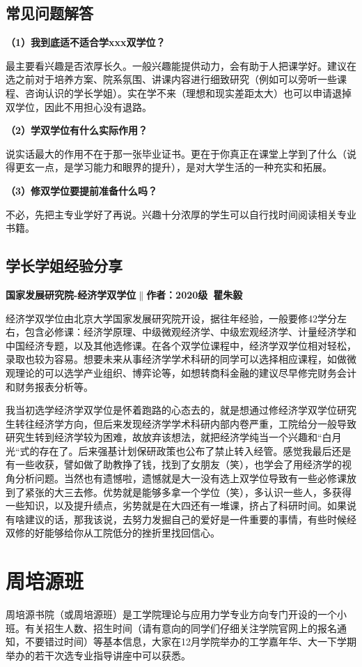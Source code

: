 \documentclass[11pt,oneside]{book}
\begin{document}
\subsection{常见问题解答}
\textbf{（1）我到底适不适合学xxx双学位？}

最主要看兴趣是否浓厚长久。一般兴趣能提供动力，会有助于人把课学好。建议在选之前对于培养方案、院系氛围、讲课内容进行细致研究（例如可以旁听一些课程、咨询认识的学长学姐）。实在学不来（理想和现实差距太大）也可以申请退掉双学位，因此不用担心没有退路。

\textbf{（2）学双学位有什么实际作用？}

说实话最大的作用不在于那一张毕业证书。更在于你真正在课堂上学到了什么（说得更玄一点，是学习能力和眼界的提升），是对大学生活的一种充实和拓展。

\textbf{（3）修双学位要提前准备什么吗？}

不必，先把主专业学好了再说。兴趣十分浓厚的学生可以自行找时间阅读相关专业书籍。

 
\subsection{学长学姐经验分享}
\textbf{国家发展研究院-经济学双学位$\parallel$作者：2020级\ 瞿朱毅}

经济学双学位由北京大学国家发展研究院开设，据往年经验，一般要修42学分左右，包含必修课：经济学原理、中级微观经济学、中级宏观经济学、计量经济学和中国经济专题，以及其他选修课。在各个双学位课程中，经济学双学位相对轻松，录取也较为容易。想要未来从事经济学学术科研的同学可以选择相应课程，如做微观理论的可以选学产业组织、博弈论等，如想转商科金融的建议尽早修完财务会计和财务报表分析等。

我当初选学经济学双学位是怀着跑路的心态去的，就是想通过修经济学双学位研究生转往经济学方向，但后来发现经济学学术科研内部内卷严重，工院给分一般导致研究生转到经济学较为困难，故放弃该想法，就把经济学纯当一个兴趣和“白月光“式的存在了。后来强基计划保研政策也公布了禁止转入经管。感觉我最后还是有一些收获，譬如做了助教挣了钱，找到了女朋友（笑），也学会了用经济学的视角分析问题。当然也有遗憾啦，遗憾就是大一没有选上双学位导致有一些必修课放到了紧张的大三去修。优势就是能够多拿一个学位（笑），多认识一些人，多获得一些知识，以及提升绩点，劣势就是在大四还有一堆课，挤占了科研时间。如果说有啥建议的话，那我该说，去努力发掘自己的爱好是一件重要的事情，有些时候经双修的好能够给你从工院低分的挫折里找回信心。

\newpage

\section{周培源班}
周培源书院（或周培源班）是工学院理论与应用力学专业方向专门开设的一个小班。有关招生人数、招生时间（请有意向的同学们仔细关注学院官网上的报名通知，不要错过时间）等基本信息，大家在12月学院举办的工学嘉年华、大一下学期举办的若干次选专业指导讲座中可以获悉。
\end{document}
